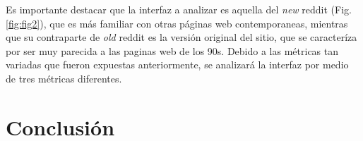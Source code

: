 Es importante destacar que la interfaz a analizar es aquella del \emph{new} reddit (Fig. \ref{fig:fig2}), que es
más familiar con otras páginas web contemporaneas, mientras que su contraparte de \emph{old}
reddit es la versión original del sitio, que se caracteríza por ser muy parecida a las paginas
web de los 90s. Debido a las métricas tan variadas que fueron expuestas anteriormente, se analizará
la interfaz por medio de tres métricas diferentes.
\\


\section{Conclusión}


